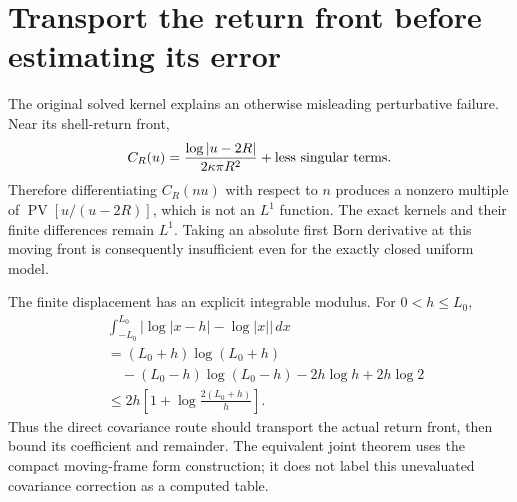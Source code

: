 \section{Transport the return front before estimating its error}
The original solved kernel explains an otherwise misleading perturbative
failure.  Near its shell-return front,
\[
 C_R(u)=\frac{\log|u-2R|}{2\kappa\pi R^2}
                       +\hbox{less singular terms}.
\]
Therefore differentiating $C_R(nu)$ with respect to $n$ produces a nonzero
multiple of $\operatorname{PV}[u/(u-2R)]$, which is not an $L^1$ function.
The exact kernels and their finite differences remain $L^1$.
Taking an absolute first Born derivative at this moving front is consequently
insufficient even for the exactly closed uniform model.

The finite displacement has an explicit integrable modulus.  For
$0<h\le L_0$,
\begin{align*}
 &\int_{-L_0}^{L_0}
    \big|\log|x-h|-\log|x|\big|\,dx\\
 &=(L_0+h)\log(L_0+h)\\
 &\quad -(L_0-h)\log(L_0-h)-2h\log h+2h\log2\\
 &\le2h\left[1+\log\frac{2(L_0+h)}h\right].
\end{align*}
Thus the direct covariance route should transport the actual return front,
then bound its coefficient and remainder.  The equivalent joint theorem
uses the compact moving-frame form construction; it does not label this
unevaluated covariance correction as a computed table.
